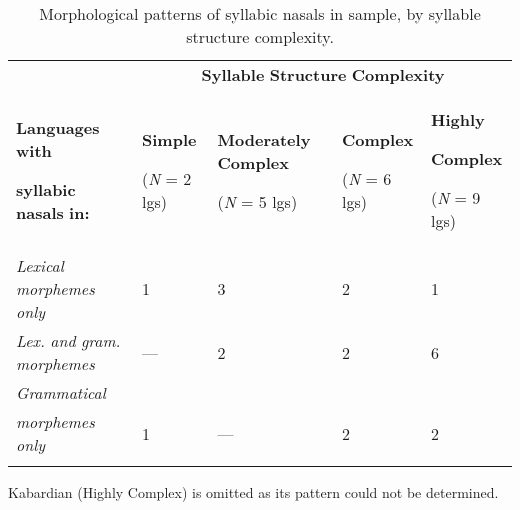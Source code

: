 \begin{table}
\begin{tabularx}{\textwidth}{XXXXX}
 & \multicolumn{4}{c}{ \textbf{Syllable} \textbf{Structure} \textbf{Complexity}}\\
\lsptoprule
{ \textbf{Languages} \textbf{with} }

 \textbf{syllabic} \textbf{nasals} \textbf{in:} & { \textbf{Simple}}

 (\textit{N} = 2 lgs) & { \textbf{Moderately} \textbf{Complex}}

 (\textit{N} = 5 lgs) & { \textbf{Complex}}

 (\textit{N} = 6 lgs) & { \textbf{Highly} }

{ \textbf{Complex}}

 (\textit{N} = 9 lgs)\\
 \textit{Lexical} \textit{morphemes} \textit{only} & 1 & 3 & 2 & 1\\
 \textit{Lex.} \textit{and} \textit{gram.} \textit{morphemes} & — & 2 & 2 & 6\\
 \textit{Grammatical} \\
\textit{morphemes} \textit{only} & 1 & — & 2 & 2\\
\lspbottomrule
\end{tabularx}
\caption{\label{3.9}Morphological patterns of syllabic nasals in sample, by syllable structure complexity.}Kabardian (Highly Complex) is omitted as its pattern could not be determined.
\end{table}







